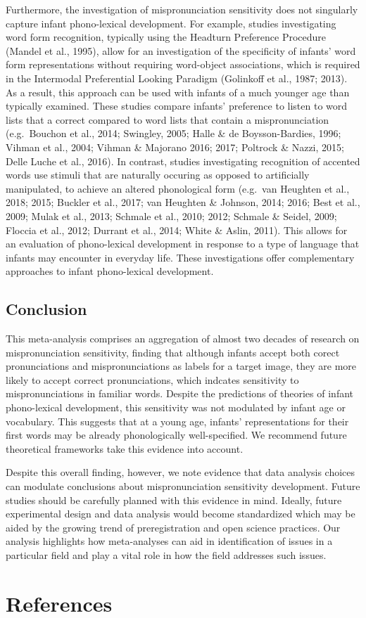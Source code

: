 \documentclass[man]{apa6}
\theoremstyle{definition}
\theoremstyle{definition}
\theoremstyle{definition}
\theoremstyle{remark}
\begin{document}
Furthermore, the investigation of mispronunciation sensitivity does not
singularly capture infant phono-lexical development. For example,
studies investigating word form recognition, typically using the
Headturn Preference Procedure (Mandel et al., 1995), allow for an
investigation of the specificity of infants' word form representations
without requiring word-object associations, which is required in the
Intermodal Preferential Looking Paradigm (Golinkoff et al., 1987; 2013).
As a result, this approach can be used with infants of a much younger
age than typically examined. These studies compare infants' preference
to listen to word lists that a correct compared to word lists that
contain a mispronunciation (e.g.~Bouchon et al., 2014; Swingley, 2005;
Halle \& de Boysson-Bardies, 1996; Vihman et al., 2004; Vihman \&
Majorano 2016; 2017; Poltrock \& Nazzi, 2015; Delle Luche et al., 2016).
In contrast, studies investigating recognition of accented words use
stimuli that are naturally occuring as opposed to artificially
manipulated, to achieve an altered phonological form (e.g.~van Heughten
et al., 2018; 2015; Buckler et al., 2017; van Heughten \& Johnson, 2014;
2016; Best et al., 2009; Mulak et al., 2013; Schmale et al., 2010; 2012;
Schmale \& Seidel, 2009; Floccia et al., 2012; Durrant et al., 2014;
White \& Aslin, 2011). This allows for an evaluation of phono-lexical
development in response to a type of language that infants may encounter
in everyday life. These investigations offer complementary approaches to
infant phono-lexical development.

\subsection{Conclusion}\label{conclusion}

This meta-analysis comprises an aggregation of almost two decades of
research on mispronunciation sensitivity, finding that although infants
accept both corect pronunciations and mispronunciations as labels for a
target image, they are more likely to accept correct pronunciations,
which indcates sensitivity to mispronunciations in familiar words.
Despite the predictions of theories of infant phono-lexical development,
this sensitivity was not modulated by infant age or vocabulary. This
suggests that at a young age, infants' representations for their first
words may be already phonologically well-specified. We recommend future
theoretical frameworks take this evidence into account.

Despite this overall finding, however, we note evidence that data
analysis choices can modulate conclusions about mispronunciation
sensitivity development. Future studies should be carefully planned with
this evidence in mind. Ideally, future experimental design and data
analysis would become standardized which may be aided by the growing
trend of preregistration and open science practices. Our analysis
highlights how meta-analyses can aid in identification of issues in a
particular field and play a vital role in how the field addresses such
issues.

\newpage

\section{References}\label{references}

\begingroup
\setlength{\parindent}{-0.5in} \setlength{\leftskip}{0.5in}

\hypertarget{refs}{}

\endgroup
\end{document}
